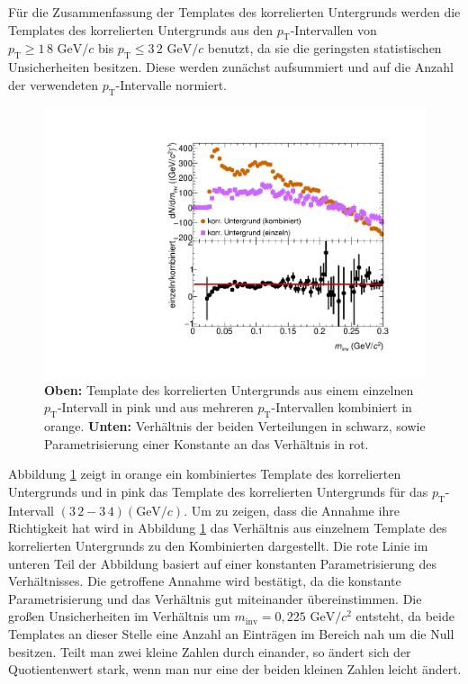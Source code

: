 Für die Zusammenfassung der Templates des korrelierten Untergrunds werden die Templates des korrelierten Untergrunds aus den $p_\text{T}$-Intervallen von $p_\text{T} \geq 1\,8\text{ GeV}/c$ bis $p_\text{T} \leq 3\,2\text{ GeV}/c$ benutzt, da sie die geringsten statistischen Unsicherheiten besitzen.
Diese werden zunächst aufsummiert und auf die Anzahl der verwendeten $p_\text{T}$-Intervalle normiert.
\begin{figure}[tp]
\centering
\includegraphics[width=.7\linewidth]{BackgroundWithRatio10_Data_2016.pdf}
\caption{\textbf{Oben:} Template des korrelierten Untergrunds aus einem einzelnen $p_\text{T}$-Intervall in pink und aus mehreren $p_\text{T}$-Intervallen kombiniert in orange.
\textbf{Unten:} Verhältnis der beiden Verteilungen in schwarz, sowie Parametrisierung einer Konstante an das Verhältnis in rot.}
\label{fig:BkgTempRatio}
\end{figure}
\newline
Abbildung \ref{fig:BkgTempRatio} zeigt in orange ein kombiniertes Template des korrelierten Untergrunds und in pink das Template des korrelierten Untergrunds für das $p_\text{T}$-Intervall $(3\,2 - 3\,4) (\text{GeV/}c)$.
Um zu zeigen, dass die Annahme ihre Richtigkeit hat wird in Abbildung \ref{fig:BkgTempRatio} das Verhältnis aus einzelnem Template des korrelierten Untergrunds zu den Kombinierten dargestellt.
Die rote Linie im unteren Teil der Abbildung basiert auf einer konstanten Parametrisierung des Verhältnisses.
Die getroffene Annahme wird bestätigt, da die konstante Parametrisierung und das Verhältnis gut miteinander übereinstimmen.
Die großen Unsicherheiten im Verhältnis um $m_\text{inv} = 0,225\text{ GeV}/c^{2}$ entsteht, da beide Templates an dieser Stelle eine Anzahl an Einträgen im Bereich nah um die Null besitzen.
Teilt man zwei kleine Zahlen durch einander, so ändert sich der Quotientenwert stark, wenn man nur eine der beiden kleinen Zahlen leicht ändert.
